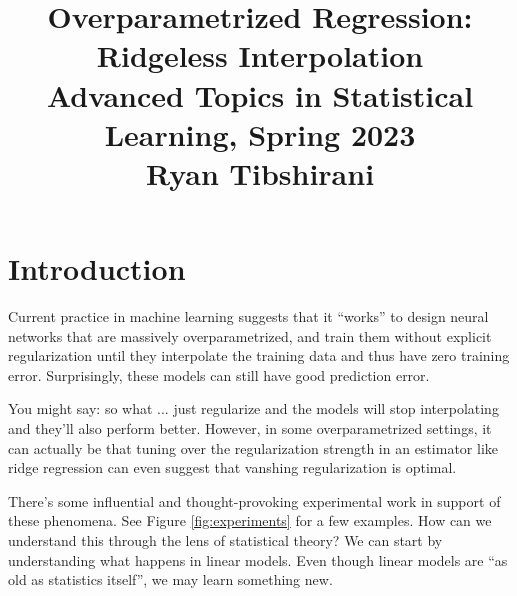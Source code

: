 \documentclass{article}
\title{Overparametrized Regression: Ridgeless Interpolation \\ \smallskip
\large Advanced Topics in Statistical Learning, Spring 2023 \\ \smallskip
Ryan Tibshirani }
\date{}
\begin{document}
\maketitle
\RaggedRight
\vspace{-50pt}

\section{Introduction}

Current practice in machine learning suggests that it ``works'' to design neural
networks that are massively overparametrized, and train them without explicit
regularization until they interpolate the training data and thus have zero
training error. Surprisingly, these models can still have good prediction error.     

You might say: so what ... just regularize and the models will stop
interpolating and they'll also perform better. However, in some overparametrized
settings, it can actually be that tuning over the regularization strength in an
estimator like ridge regression can even suggest that vanshing regularization is 
optimal.

There's some influential and thought-provoking experimental work in support of
these phenomena. See Figure \ref{fig:experiments} for a few examples. How can we 
understand this through the lens of statistical theory?  We can start by
understanding what happens in linear models. Even though linear models are ``as 
old as statistics itself'', we may learn something new.   
\end{document}

